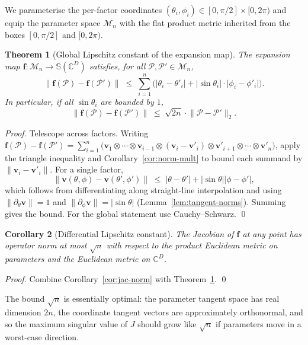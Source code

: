 \documentclass[11pt,letterpaper]{article}
\newtheorem{theorem}{Theorem}[section]
\newtheorem{corollary}[theorem]{Corollary}
\theoremstyle{definition}
\newcommand{\C}{\mathbb{C}}
\newcommand{\Sphere}{\mathbb{S}}
\newcommand{\Polygram}{\mathcal{P}}
\newcommand{\Mset}{\mathcal{M}}
\newcommand{\norm}[1]{\lVert #1 \rVert}
\newcommand{\abs}[1]{\lvert #1 \rvert}
\begin{document}
We parameterise the per-factor coordinates $(\theta_{i}, \phi_{i}) \in [0,
\pi/2] \times [0, 2\pi)$ and equip the parameter space $\Mset_{n}$ with the
flat product metric inherited from the boxes $[0,\pi/2]$ and $[0, 2\pi)$.

\begin{theorem}[Global Lipschitz constant of the expansion map]
\label{thm:lipschitz}
The expansion map $\bm{f} : \Mset_{n} \to \Sphere(\C^{D})$ satisfies, for all
$\Polygram, \Polygram' \in \Mset_{n}$,
\[
\norm{\bm{f}(\Polygram) - \bm{f}(\Polygram')}
   \;\leq\; \sum_{i=1}^{n}
   \bigg(\abs{\theta_{i} - \theta'_{i}}
       + \abs{\sin\theta_{i}}\cdot\abs{\phi_{i} - \phi'_{i}}\bigg).
\]
In particular, if all $\sin\theta_{i}$ are bounded by $1$,
\[
\norm{\bm{f}(\Polygram) - \bm{f}(\Polygram')} \;\leq\; \sqrt{2n}\cdot
\norm{\Polygram - \Polygram'}_{2}.
\]
\end{theorem}
\begin{proof}
Telescope across factors. Writing $\bm{f}(\Polygram) - \bm{f}(\Polygram') =
\sum_{i=1}^{n} \big(\bm{v}_{1} \otimes \cdots \otimes \bm{v}_{i-1} \otimes
(\bm{v}_{i} - \bm{v}'_{i}) \otimes \bm{v}'_{i+1} \otimes \cdots \otimes
\bm{v}'_{n}\big)$, apply the triangle inequality and Corollary~\ref{cor:norm-mult}
to bound each summand by $\norm{\bm{v}_{i} - \bm{v}'_{i}}$. For a single
factor,
\[
\norm{\bm{v}(\theta,\phi) - \bm{v}(\theta',\phi')}
   \;\leq\; \abs{\theta - \theta'} + \abs{\sin\theta}\abs{\phi - \phi'},
\]
which follows from differentiating along straight-line interpolation and
using $\norm{\partial_{\theta}\bm{v}} = 1$ and $\norm{\partial_{\phi}\bm{v}} =
\abs{\sin\theta}$ (Lemma~\ref{lem:tangent-norms}). Summing gives the bound.
For the global statement use Cauchy--Schwarz. \qed
\end{proof}

\begin{corollary}[Differential Lipschitz constant]
\label{cor:diff-lip}
The Jacobian of $\bm{f}$ at any point has operator norm at most $\sqrt{n}$
with respect to the product Euclidean metric on parameters and the Euclidean
metric on $\C^{D}$.
\end{corollary}

\begin{proof}
Combine Corollary~\ref{cor:jac-norm} with Theorem~\ref{thm:lipschitz}. \qed
\end{proof}

The bound $\sqrt{n}$ is essentially optimal: the parameter tangent space
has real dimension $2n$, the coordinate tangent vectors are approximately
orthonormal, and so the maximum singular value of $J$ should grow like
$\sqrt{n}$ if parameters move in a worst-case direction.
\end{document}
